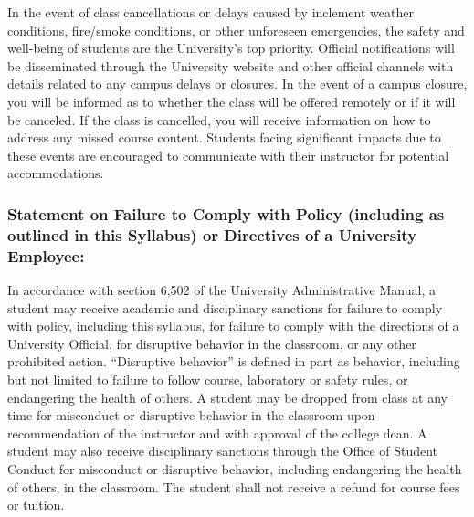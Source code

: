 \documentclass[
]{article}
\begin{document}
In the event of class cancellations or delays caused by inclement
weather conditions, fire/smoke conditions, or other unforeseen
emergencies, the safety and well-being of students are the University's
top priority. Official notifications will be disseminated through the
University website and other official channels with details related to
any campus delays or closures. In the event of a campus closure, you
will be informed as to whether the class will be offered remotely or if
it will be canceled. If the class is cancelled, you will receive
information on how to address any missed course content. Students facing
significant impacts due to these events are encouraged to communicate
with their instructor for potential accommodations.

\subsubsection{Statement on Failure to Comply with Policy (including as
outlined in this Syllabus) or Directives of a University
Employee:}\label{statement-on-failure-to-comply-with-policy-including-as-outlined-in-this-syllabus-or-directives-of-a-university-employee}

In accordance with section 6,502 of the University Administrative
Manual, a student may receive academic and disciplinary sanctions for
failure to comply with policy, including this syllabus, for failure to
comply with the directions of a University Official, for disruptive
behavior in the classroom, or any other prohibited action. ``Disruptive
behavior'' is defined in part as behavior, including but not limited to
failure to follow course, laboratory or safety rules, or endangering the
health of others. A student may be dropped from class at any time for
misconduct or disruptive behavior in the classroom upon recommendation
of the instructor and with approval of the college dean. A student may
also receive disciplinary sanctions through the Office of Student
Conduct for misconduct or disruptive behavior, including endangering the
health of others, in the classroom. The student shall not receive a
refund for course fees or tuition.
\end{document}
